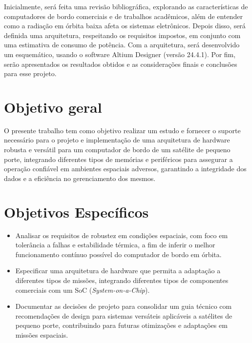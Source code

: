 Inicialmente, será feita uma revisão bibliográfica, explorando as características de computadores de bordo comerciais e de trabalhos acadêmicos, além de entender como a radiação em órbita baixa afeta os sistemas eletrônicos. Depois disso, será definida uma arquitetura, respeitando os requisitos impostos, em conjunto com uma estimativa de consumo de potência. Com a arquitetura, será desenvolvido um esquemático, usando o software Altium Designer (versão 24.4.1). Por fim, serão apresentados os resultados obtidos e as considerações finais e conclusões para esse projeto.

\section{Objetivo geral}

O presente trabalho tem como objetivo realizar um estudo e fornecer o suporte necessário para o projeto e implementação de uma arquitetura de hardware robusta e versátil para um computador de bordo de um satélite de pequeno porte, integrando diferentes tipos de memórias e periféricos para assegurar a operação confiável em ambientes espaciais adversos, garantindo a integridade dos dados e a eficiência no gerenciamento dos mesmos.

\section{Objetivos Específicos}

\begin{itemize}
    \item Analisar os requisitos de robustez em condições espaciais, com foco em tolerância a falhas e estabilidade térmica, a fim de inferir o melhor funcionamento contínuo possível do computador de bordo em órbita.
    \item Especificar uma arquitetura de hardware que permita a adaptação a diferentes tipos de missões, integrando diferentes tipos de componentes comerciais com um SoC (\textit{System-on-a-Chip}).
    \item  Documentar as decisões de projeto para consolidar um guia técnico com recomendações de design para sistemas versáteis aplicáveis a satélites de pequeno porte, contribuindo para futuras otimizações e adaptações em missões espaciais.
\end{itemize}

